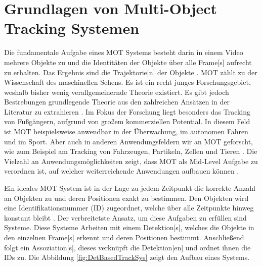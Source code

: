 \section{Grundlagen von Multi-Object Tracking Systemen}
Die fundamentale Aufgabe eines \gls{MOT} Systems besteht darin in einem Video mehrere Objekte zu  und die Identitäten der Objekte über alle \gls{Frame}[s] aufrecht zu erhalten. Das Ergebnis sind die \gls{Trajektorie}[n] der Objekte \cite{CLEAR.2008, HOTA, Luo.2022}. \gls{MOT} zählt zu der Wissenschaft des maschinellen Sehens. Es ist ein recht junges Forschungsgebiet, weshalb bisher wenig verallgemeinernde Theorie existiert. Es gibt jedoch Bestrebungen grundlegende Theorie aus den zahlreichen Ansätzen in der Literatur zu extrahieren \cite{Luo.2022}. Im Fokus der Forschung liegt besonders das Tracking von Fußgängern, aufgrund von großem kommerziellen Potential. In diesem Feld ist \gls{MOT} beispielsweise anwendbar in der Überwachung, im autonomen Fahren und im Sport. Aber auch in anderen Anwendungsfeldern wir an \gls{MOT} geforscht, wie zum Beispiel am \gls{Tracking} von Fahrzeugen, Partikeln, Zellen und Tieren \cite{Luo.2022, CLEAR.2008, Crocker.1996}. Die Vielzahl an Anwendungsmöglichkeiten zeigt, dass \gls{MOT} als \gls{Mid-Level Aufgabe} zu verordnen ist, auf welcher weiterreichende Anwendungen aufbauen können \cite{Luo.2022}.\par

Ein ideales \gls{MOT} System ist in der Lage zu jedem Zeitpunkt die korrekte Anzahl an Objekten zu  und deren Positionen exakt zu bestimmen. Den Objekten wird eine Identifikationsnummer (\acrshort{ID}) zugeordnet, welche über alle Zeitpunkte hinweg konstant bleibt \cite{CLEAR.2008}. Der verbreitetste Ansatz, um diese Aufgaben zu erfüllen sind  Systeme. Diese Systeme  Arbeiten mit einem \gls{Detektion}[s], welches die Objekte in den einzelnen \gls{Frame}[s] erkennt und deren Positionen bestimmt. Anschließend folgt ein \gls{Assoziation}[s], dieses verknüpft die \gls{Detektion}[en] und ordnet ihnen die \acrshort{ID}s zu\cite{Luo.2022, HOTA}. Die Abbildung \ref{fig:DetBasedTrackSys} zeigt den Aufbau eines  Systems. 


